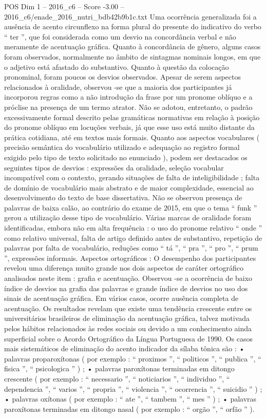 \begin{textsample}{POS Dim 1 – 2016\_c6 – Score -3.00 – 2016\_c6/enade\_2016\_nutri\_bdb42b9b1c.txt}
Uma ocorrência generalizada foi a ausência de acento circunflexo na forma plural do presente do indicativo do verbo “ ter ”, que foi considerada como um desvio na concordância verbal e não meramente de acentuação gráfica.
Quanto à concordância de gênero, alguns casos foram observados, normalmente no âmbito de sintagmas nominais longos, em que o adjetivo está afastado do substantivo.
Quanto à questão da colocação pronominal, foram poucos os desvios observados.
Apesar de serem aspectos relacionados à oralidade, observou -se que a maioria dos participantes já incorporou regras como a não introdução da frase por um pronome oblíquo e a próclise na presença de um termo atrator.
Não se adotou, entretanto, o padrão excessivamente formal descrito pelas gramáticas normativas em relação à posição do pronome oblíquo em locuções verbais, já que esse uso está muito distante da prática cotidiana, até em textos mais formais.
Quanto aos aspectos vocabulares ( precisão semântica do vocabulário utilizado e adequação ao registro formal exigido pelo tipo de texto solicitado no enunciado ), podem ser destacados os seguintes tipos de desvios : expressões da oralidade, seleção vocabular incompatível com o contexto, gerando situações de falta de inteligibilidade ; falta de domínio de vocabulário mais abstrato e de maior complexidade, essencial ao desenvolvimento do texto de base dissertativa.
Não se observou presença de palavras de baixa calão, ao contrário do exame de 2015, em que o tema “ funk ” gerou a utilização desse tipo de vocabulário.
Várias marcas de oralidade foram identificadas, embora não em alta frequência : o uso do pronome relativo “ onde ” como relativo universal, falta de artigo definido antes de substantivo, repetição de palavras por falta de vocabulário, reduções como “ tá ”, “ pra ”, “ pro ”, “ prum ”, expressões informais.
Aspectos ortográficos : O desempenho dos participantes revelou uma diferença muito grande nos dois aspectos de caráter ortográfico analisados neste item : grafia e acentuação.
Observou -se a ocorrência de baixo índice de desvios na grafia das palavras e grande índice de desvios no uso dos sinais de acentuação gráfica.
Em vários casos, ocorre ausência completa de acentuação.
Os resultados revelam que existe uma tendência crescente entre os universitários brasileiros de eliminação da acentuação gráfica, talvez motivada pelos hábitos relacionados às redes sociais ou devido a um conhecimento ainda superficial sobre o Acordo Ortográfico da Língua Portuguesa de 1990.
Os casos mais sistemáticos de eliminação do acento indicador da sílaba tônica são : • palavras proparoxítonas ( por exemplo : “ proximos ”, “ politicos ”, “ publica ”, “ fisica ”, “ psicologica ” ) ; • palavras paroxítonas terminadas em ditongo crescente ( por exemplo : “ necessario ”, “ noticiarios ”, “ individuo ”, “ dependencia ”, “ varios ”, “ propria ”, “ violencia ”, “ ocorrencia ”, “ suicidio ” ) ; • palavras oxítonas ( por exemplo : “ ate ”, “ tambem ”, “ mes ” ) ; • palavras paroxítonas terminadas em ditongo nasal ( por exemplo : “ orgão ”, “ orfão ” ).

\end{textsample}
